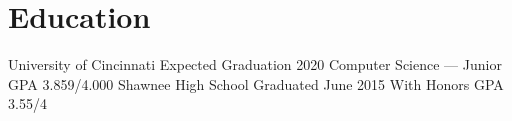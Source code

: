 \section{Education}
\newcommand{\eduentry}[2]{%
    {#1 \hfill #2}%
}
\eduentry{University of Cincinnati}{Expected Graduation 2020}\newline
\eduentry{Computer Science --- Junior}{GPA 3.859/4.000}\newline\newline
\eduentry{Shawnee High School}{Graduated June 2015}\newline
\eduentry{With Honors}{GPA 3.55/4}
